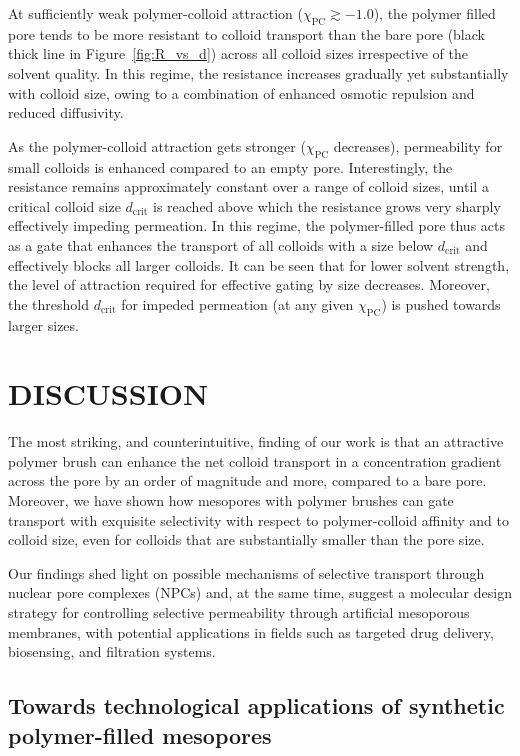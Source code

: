 \documentclass[12pt, a4paper]{article}
\begin{document}
At sufficiently weak polymer-colloid attraction ($\chi_{\text{PC}} \gtrsim -1.0$), the polymer filled pore tends to be more resistant to colloid transport than the bare pore (black thick line in Figure~\ref{fig:R_vs_d}) across all colloid sizes irrespective of the solvent quality.
In this regime, the resistance increases gradually yet substantially with colloid size, owing to a combination of enhanced osmotic repulsion and reduced diffusivity.

As the polymer-colloid attraction gets stronger ($\chi_{\text{PC}}$ decreases), permeability for small colloids is enhanced compared to an empty pore. 
Interestingly, the resistance remains approximately constant over a range of colloid sizes, until a critical colloid size $d_{\text{crit}}$ is reached above which the resistance grows very sharply effectively impeding permeation. 
In this regime, the polymer-filled pore thus acts as a gate that enhances the transport of all colloids with a size below $d_{\text{crit}}$ and effectively blocks all larger colloids.
It can be seen that for lower solvent strength, the level of attraction required for effective gating by size decreases. 
Moreover, the threshold $d_{\text{crit}}$ for impeded permeation (at any given $\chi_{\text{PC}}$) is pushed towards larger sizes.


\section{DISCUSSION}

The most striking, and counterintuitive, finding of our work is that an attractive polymer brush can enhance the net colloid transport in a concentration gradient across the pore by an order of magnitude and more, compared to a bare pore.
Moreover, we have shown how mesopores with polymer brushes can gate transport with exquisite selectivity with respect to polymer-colloid affinity and to colloid size, even for colloids that are substantially smaller than the pore size.

Our findings shed light on possible mechanisms of selective transport through nuclear pore complexes (NPCs) and, at the same time, suggest a molecular design strategy for controlling selective permeability through artificial mesoporous membranes, with potential applications in fields such as targeted drug delivery, biosensing, and filtration systems.

\subsection{Towards technological applications of synthetic polymer-filled mesopores}
\end{document}
